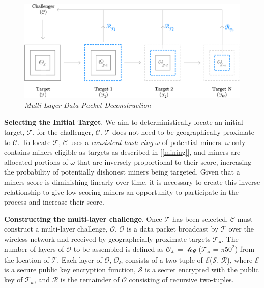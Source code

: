 \documentclass[letterpaper,11pt]{article}
\begin{document}
\begin{figure}[H]
	\begin{center}
  		\includegraphics[width=\textwidth]{diagram2.eps}
  		\caption{\textit{Multi-Layer Data Packet Deconstruction}}
  		\label{fig:poc-construction}
 	\end{center}
\end{figure}

\textbf{Selecting the Initial Target}. We aim to deterministically locate an initial target, $\mathcal{T}$, for the challenger, $\mathcal{C}$. $\mathcal{T}$ does not need to be geographically proximate to $\mathcal{C}$. To locate $\mathcal{T}$, $\mathcal{C}$ uses a \textit{consistent hash ring} $\mathcal{\omega}$ of potential miners. $\mathcal{\omega}$ only contains miners eligible as targets as described in [\ref{mining}], and miners are allocated portions of $\mathcal{\omega}$ that are inversely proportional to their score, increasing the probability of potentially dishonest miners being targeted. Given that a miners score is diminishing linearly over time, it is necessary to create this inverse relationship to give low-scoring miners an opportunity to participate in the process and increase their score.\newline

\textbf{Constructing the multi-layer challenge}. Once $\mathcal{T}$ has been selected, $\mathcal{C}$ must construct a multi-layer challenge, $\mathcal{O}$. $\mathcal{O}$ is a data packet broadcast by $\mathcal{T}$ over the wireless network and received by geographcially proximate targets $\mathcal{T_n}$. The number of layers of $\mathcal{O}$ to be assembled is defined as $\mathcal{O_L}$ = $\mathcal{\log}$($\mathcal{T_n}$ = $\mathcal{\pi}$$\mathcal{50^2}$) from the location of $\mathcal{T}$. Each layer of $\mathcal{O}$, $\mathcal{O_l}$, consists of a two-tuple of $\mathcal{E}$($\mathcal{S}$, $\mathcal{R}$), where $\mathcal{E}$ is a secure public key encryption function, $\mathcal{S}$ is a secret encrypted with the public key of $\mathcal{T_n}$, and $\mathcal{R}$ is the remainder of $\mathcal{O}$ consisting of recursive two-tuples.\newline
\end{document}
